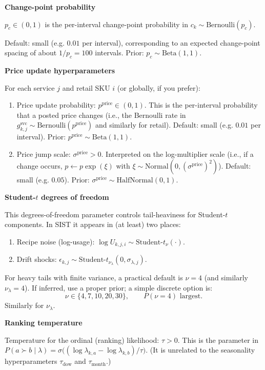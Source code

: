 \documentclass[11pt]{article}
\begin{document}
\textbf{Change-point probability}

$p_c \in (0,1)$ is the per-interval change-point probability in
$c_k\sim\text{Bernoulli}(p_c)$.

Default: small (e.g. $0.01$ per interval), corresponding to an expected change-point spacing of about $1/p_c=100$ intervals.
Prior: $p_c \sim \text{Beta}(1,1)$.

\textbf{Price update hyperparameters}

For each service $j$ and retail SKU $i$ (or globally, if you prefer):
\begin{enumerate}
  \item Price update probability: $p^{\mathrm{price}} \in (0,1)$.
  This is the per-interval probability that a posted price changes (i.e., the Bernoulli rate in $g^{\mathrm{svc}}_{k,j}\sim\text{Bernoulli}(p^{\mathrm{price}})$ and similarly for retail).
  Default: small (e.g. $0.01$ per interval).
  Prior: $p^{\mathrm{price}} \sim \text{Beta}(1,1)$.

  \item Price jump scale: $\sigma^{\mathrm{price}} > 0$.
  Interpreted on the log-multiplier scale (i.e., if a change occurs, $p\leftarrow p\exp(\xi)$ with $\xi\sim\text{Normal}(0,(\sigma^{\mathrm{price}})^2)$).
  Default: small (e.g. $0.05$).
  Prior: $\sigma^{\mathrm{price}} \sim \text{HalfNormal}(0,1)$.
\end{enumerate}

\textbf{Student-$t$ degrees of freedom}

This degrees-of-freedom parameter controls tail-heaviness for Student-$t$ components.
In SIST it appears in (at least) two places:
\begin{enumerate}
  \item Recipe noise (log-usage): $\log U_{k,j,i}\sim\text{Student-}t_{\nu}(\cdot)$.
  \item Drift shocks: $\epsilon_{k,j}\sim\text{Student-}t_{\nu_{\lambda}}(0,\sigma_{\lambda,j})$.
\end{enumerate}

For heavy tails with finite variance, a practical default is $\nu=4$ (and similarly $\nu_{\lambda}=4$).
If inferred, use a proper prior; a simple discrete option is:
\[
  \nu \in \{4,7,10,20,30\},\qquad P(\nu=4)\text{ largest.}
\]
Similarly for $\nu_{\lambda}$.

\textbf{Ranking temperature}

Temperature for the ordinal (ranking) likelihood: $\tau>0$.
This is the parameter in
$P(a\succ b\mid\lambda)=\sigma\bigl((\log\lambda_{k,a}-\log\lambda_{k,b})/\tau\bigr)$.
(It is unrelated to the seasonality hyperparameters $\tau_{\text{dow}}$ and $\tau_{\text{month}}$.)
\end{document}
